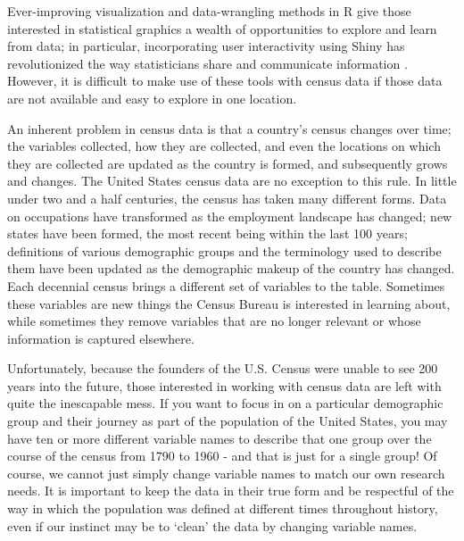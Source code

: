 \documentclass[DIV=calc, paper=a4, fontsize=10pt, twocolumn]{scrartcl}\usepackage[]{graphicx}\usepackage[]{color}
\begin{document}
\par Ever-improving visualization and data-wrangling methods in R \citep{RCoreTeam} give those interested in statistical graphics a wealth of opportunities to explore and learn from data; in particular, incorporating user interactivity using Shiny has revolutionized the way statisticians share and communicate information \citep{Shiny}. However, it is difficult to make use of these tools with census data if those data are not available and easy to explore in one location.  

\par An inherent problem in census data is that a country's census changes over time; the variables collected, how they are collected, and even the locations on which they are collected are updated as the country is formed, and subsequently grows and changes. The United States census data are no exception to this rule. In little under two and a half centuries, the census has taken many different forms. Data on occupations have transformed as the employment landscape has changed; new states have been formed, the most recent being within the last 100 years; definitions of various demographic groups and the terminology used to describe them have been updated as the demographic makeup of the country has changed. Each decennial census brings a different set of variables to the table. Sometimes these variables are new things the Census Bureau is interested in learning about, while sometimes they remove variables that are no longer relevant or whose information is captured elsewhere.  

\par Unfortunately, because the founders of the U.S. Census were unable to see 200 years into the future, those interested in working with census data are left with quite the inescapable mess. If you want to focus in on a particular demographic group and their journey as part of the population of the United States, you may have ten or more different variable names to describe that one group over the course of the census from 1790 to 1960 - and that is just for a single group! Of course, we cannot just simply change variable names to match our own research needs. It is important to keep the data in their true form and be respectful of the way in which the population was defined at different times throughout history, even if our instinct may be to `clean' the data by changing variable names.  
\end{document}
